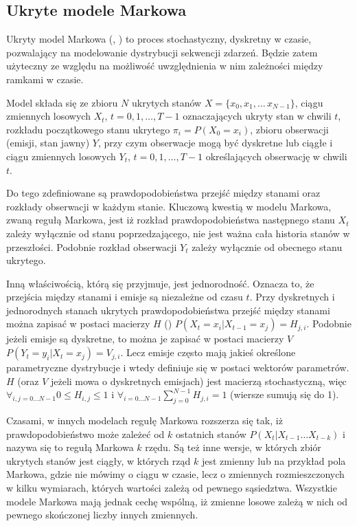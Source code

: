 \subsection{Ukryte modele Markowa}\label{sec:hmm}

Ukryty model Markowa (, ) to proces stochastyczny,
dyskretny w czasie, pozwalający na modelowanie dystrybucji
sekwencji zdarzeń. Będzie zatem użyteczny ze względu na możliwość uwzględnienia w nim zależności
między ramkami w czasie.

Model składa się ze zbioru $N$ ukrytych stanów $X = \{x_0, x_1, \dots\, x_{N-1}\}$, ciągu zmiennych losowych
$X_t$, $t = 0, 1, \dots, T - 1$ oznaczających ukryty stan w chwili $t$, rozkładu początkowego stanu ukrytego
$\pi_i = P(X_0 = x_i)$, zbioru obserwacji (emisji, stan jawny) $Y$, przy czym obserwacje mogą być dyskretne
lub ciągłe i ciągu zmiennych losowych $Y_t$, $t = 0, 1, \dots, T - 1$ określających obserwację w chwili $t$.

Do tego zdefiniowane są prawdopodobieństwa przejść między stanami oraz rozkłady obserwacji w każdym stanie.
Kluczową kwestią w modelu Markowa, zwaną regułą Markowa, jest iż rozkład prawdopodobieństwa następnego stanu $X_t$
zależy wyłącznie od stanu poprzedzającego, nie jest ważna cała historia stanów w przeszłości. Podobnie rozkład
obserwacji $Y_t$ zależy wyłącznie od obecnego stanu ukrytego.

Inną właściwością, którą się przyjmuje, jest jednorodność. Oznacza to, że przejścia między stanami i emisje są
niezależne od czasu $t$. Przy dyskretnych i jednorodnych stanach ukrytych prawdopodobieństwa przejść
między stanami można zapisać w postaci macierzy $H$ () $P(X_t = x_i | X_{t-1} = x_j) = H_{j, i}$.
Podobnie jeżeli emisje są dyskretne, to można je zapisać w postaci macierzy $V$ $P(Y_t = y_i | X_t = x_j) = V_{j, i}$.
Lecz emisje często mają jakieś określone parametryczne dystrybucje i wtedy definiuje się w postaci wektorów parametrów.
$H$ (oraz $V$ jeżeli mowa o dyskretnych emisjach) jest macierzą stochastyczną, więc $\forall_{i, j = 0 \dots N - 1} 0 \leq H_{i, j} \leq 1$ i $\forall_{i = 0 \dots N - 1} \sum_{j = 0}^{N - 1} H_{j, i} = 1$ (wiersze sumują się do 1).

Czasami, w innych modelach regułę Markowa rozszerza się tak, iż prawdopodobieństwo może zależeć od $k$ ostatnich stanów
$P(X_t | X_{t-1} \dots X_{t-k})$ i nazywa się to regułą Markowa $k$ rzędu. Są też inne wersje, w których zbiór
ukrytych stanów jest ciągły, w których rząd $k$ jest zmienny lub na przykład pola Markowa,
gdzie nie mówimy o ciągu w czasie, lecz o zmiennych rozmieszczonych
w kilku wymiarach, których wartości zależą od pewnego sąsiedztwa. Wszystkie modele Markowa mają jednak cechę wspólną, iż
zmienne losowe zależą w nich od pewnego skończonej liczby innych zmiennych.

